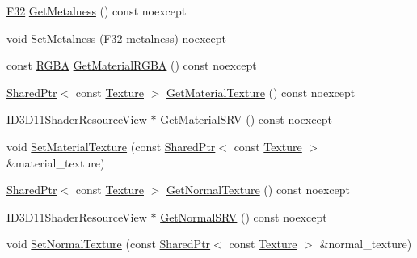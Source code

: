\begin{DoxyCompactItemize}
\item 
\hyperlink{namespacemage_aa97e833b45f06d60a0a9c4fc22ae02c0}{F32} \hyperlink{classmage_1_1_material_a9d91ff9ce999d24558305f070d0cde93}{Get\+Metalness} () const noexcept
\item 
void \hyperlink{classmage_1_1_material_a70dde310b2108e9ad3041df13db0bdc0}{Set\+Metalness} (\hyperlink{namespacemage_aa97e833b45f06d60a0a9c4fc22ae02c0}{F32} metalness) noexcept
\item 
const \hyperlink{structmage_1_1_r_g_b_a}{R\+G\+BA} \hyperlink{classmage_1_1_material_a58b1f3d253b1a6d8541bc9a954e6fc1d}{Get\+Material\+R\+G\+BA} () const noexcept
\item 
\hyperlink{namespacemage_a1e01ae66713838a7a67d30e44c67703e}{Shared\+Ptr}$<$ const \hyperlink{classmage_1_1_texture}{Texture} $>$ \hyperlink{classmage_1_1_material_aa8accf832423420f6b2ed4b50ef394b3}{Get\+Material\+Texture} () const noexcept
\item 
I\+D3\+D11\+Shader\+Resource\+View $\ast$ \hyperlink{classmage_1_1_material_a0675c4bbbdb48c0db9bf82fffb073094}{Get\+Material\+S\+RV} () const noexcept
\item 
void \hyperlink{classmage_1_1_material_a8f88eda4c45268bf6a30878948055ff5}{Set\+Material\+Texture} (const \hyperlink{namespacemage_a1e01ae66713838a7a67d30e44c67703e}{Shared\+Ptr}$<$ const \hyperlink{classmage_1_1_texture}{Texture} $>$ \&material\+\_\+texture)
\item 
\hyperlink{namespacemage_a1e01ae66713838a7a67d30e44c67703e}{Shared\+Ptr}$<$ const \hyperlink{classmage_1_1_texture}{Texture} $>$ \hyperlink{classmage_1_1_material_a41a286cf05a2627ee0baef602b01a1fb}{Get\+Normal\+Texture} () const noexcept
\item 
I\+D3\+D11\+Shader\+Resource\+View $\ast$ \hyperlink{classmage_1_1_material_a0be98911c56dedaa4fd2f8714fc8a793}{Get\+Normal\+S\+RV} () const noexcept
\item 
void \hyperlink{classmage_1_1_material_a178b5b945137d7aab35db01a2e52ab31}{Set\+Normal\+Texture} (const \hyperlink{namespacemage_a1e01ae66713838a7a67d30e44c67703e}{Shared\+Ptr}$<$ const \hyperlink{classmage_1_1_texture}{Texture} $>$ \&normal\+\_\+texture)
\end{DoxyCompactItemize}
